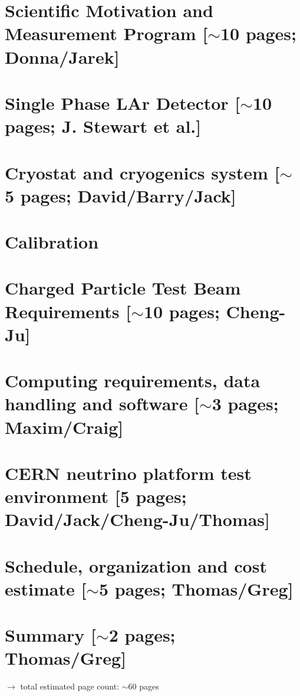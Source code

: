 \documentclass[12pt]{article}
\begin{document}
\section{Scientific Motivation and Measurement Program [$\sim$10 pages; {\color{red} Donna/Jarek}]}
	
	

\section{Single Phase LAr Detector [$\sim$10 pages; {\color{red} J. Stewart et al.}]}
\rm

	


\section{Cryostat and cryogenics system [$\sim$5 pages; {\color{red} David/Barry/Jack}]}
	
	
\section{Calibration}
	

\section{Charged Particle Test Beam Requirements [$\sim$10 pages; {\color{red} Cheng-Ju}]}
	


\section{Computing requirements, data handling and software  [$\sim$3 pages; {\color{red} Maxim/Craig}]}
	

\section{CERN neutrino platform test environment [5 pages; {\color{red} David/Jack/Cheng-Ju/Thomas}]}
	
	
	
\section{Schedule, organization and cost estimate [$\sim$5 pages; {\color{red} Thomas/Greg}]}
	

\section{Summary [$\sim$2 pages; {\color{red} Thomas/Greg}]}
	




{\color{red}
$\rightarrow$ total estimated page count: $\sim$60 pages}
\end{document}
